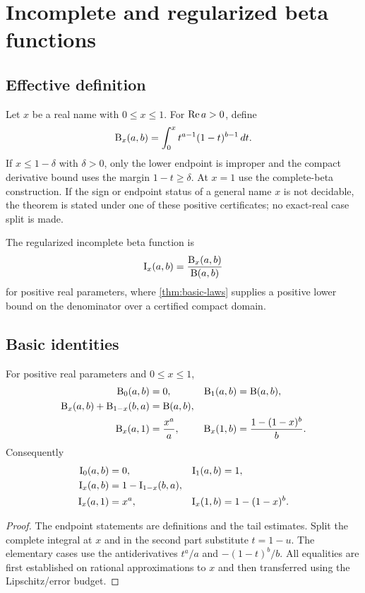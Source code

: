 \section{Incomplete and regularized beta functions}
\label{sec:incomplete}

\subsection{Effective definition}

Let $x$ be a real name with $0\le x\le1$.  For $\operatorname{Re} a>0$, define
\[
 \mathrm B_x(a,b)=\int_0^x t^{a-1}(1-t)^{b-1}\,dt.
\]
If $x\le1-\delta$ with $\delta>0$, only the lower endpoint is improper and the compact derivative bound uses the margin $1-t\ge\delta$.  At $x=1$ use the complete-beta construction.  If the sign or endpoint status of a general name $x$ is not decidable, the theorem is stated under one of these positive certificates; no exact-real case split is made.

The regularized incomplete beta function is
\[
 \mathrm I_x(a,b)=\frac{\mathrm B_x(a,b)}{\mathrm B(a,b)}
\]
for positive real parameters, where \cref{thm:basic-laws} supplies a positive lower bound on the denominator over a certified compact domain.

\subsection{Basic identities}

\begin{theorem}\label{thm:incomplete-basic}
For positive real parameters and $0\le x\le1$,
\begin{align*}
 \mathrm B_0(a,b)&=0,& \mathrm B_1(a,b)&=\mathrm B(a,b),\\
 \mathrm B_x(a,b)+\mathrm B_{1-x}(b,a)&=\mathrm B(a,b),\\
 \mathrm B_x(a,1)&=\frac{x^a}{a},&
 \mathrm B_x(1,b)&=\frac{1-(1-x)^b}{b}.
\end{align*}
Consequently
\begin{align*}
 \mathrm I_0(a,b)&=0,& \mathrm I_1(a,b)&=1,\\
 \mathrm I_x(a,b)&=1-\mathrm I_{1-x}(b,a),\\
 \mathrm I_x(a,1)&=x^a,&
 \mathrm I_x(1,b)&=1-(1-x)^b.
\end{align*}
\end{theorem}

\begin{proof}
The endpoint statements are definitions and the tail estimates.  Split the complete integral at $x$ and in the second part substitute $t=1-u$.  The elementary cases use the antiderivatives $t^a/a$ and $-(1-t)^b/b$.  All equalities are first established on rational approximations to $x$ and then transferred using the Lipschitz/error budget.
\end{proof}

